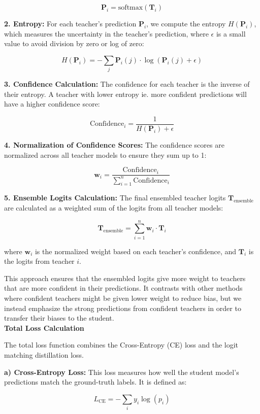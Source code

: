 \documentclass{article}
\begin{document}
\[
\mathbf{P}_i = \text{softmax}(\mathbf{T}_i)
\]

\textbf{2. Entropy:}
For each teacher's prediction \( \mathbf{P}_i \), we compute the entropy \( H(\mathbf{P}_i) \), which measures the uncertainty in the teacher's prediction, where \( \epsilon \) is a small value to avoid division by zero or log of zero:

\[
H(\mathbf{P}_i) = - \sum_j \mathbf{P}_i(j) \cdot \log(\mathbf{P}_i(j) + \epsilon)
\]



\textbf{3. Confidence Calculation:}
The confidence for each teacher is the inverse of their entropy. A teacher with lower entropy ie. more confident predictions will have a higher confidence score:

\[
\text{Confidence}_i = \frac{1}{H(\mathbf{P}_i) + \epsilon}
\]

\textbf{4. Normalization of Confidence Scores:}
The confidence scores are normalized across all teacher models to ensure they sum up to 1:

\[
\mathbf{w}_i = \frac{\text{Confidence}_i}{\sum_{i=1}^{n} \text{Confidence}_i}
\]

\textbf{5. Ensemble Logits Calculation:}
The final ensembled teacher logits \( \mathbf{T}_{\text{ensemble}} \) are calculated as a weighted sum of the logits from all teacher models:

\[
\mathbf{T}_{\text{ensemble}} = \sum_{i=1}^{n} \mathbf{w}_i \cdot \mathbf{T}_i
\]

where \( \mathbf{w}_i \) is the normalized weight based on each teacher's confidence, and \( \mathbf{T}_i \) is the logits from teacher \( i \).

This approach ensures that the ensembled logits give more weight to teachers that are more confident in their predictions. It contrasts with other methods where confident teachers might be given lower weight to reduce bias, but we instead emphasize the strong predictions from confident teachers in order to transfer their biases to the student.\\

\textbf{Total Loss Calculation}

The total loss function combines the Cross-Entropy (CE) loss and the logit matching distillation loss.

  \textbf{a) Cross-Entropy Loss:}
This loss measures how well the student model's predictions match the ground-truth labels. It is defined as:

\[
L_{\text{CE}} = - \sum_i y_i \log(p_i)
\]
\end{document}
